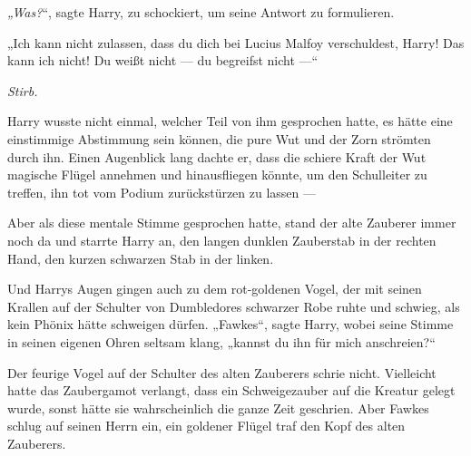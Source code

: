 \emph{„Was?}“, sagte Harry, zu schockiert, um seine Antwort zu formulieren.

„Ich kann nicht zulassen, dass du dich bei Lucius Malfoy verschuldest, Harry! Das kann ich nicht! Du weißt nicht — du begreifst nicht —“

\emph{Stirb.}

Harry wusste nicht einmal, welcher Teil von ihm gesprochen hatte, es hätte eine einstimmige Abstimmung sein können, die pure Wut und der Zorn strömten durch ihn. Einen Augenblick lang dachte er, dass die schiere Kraft der Wut magische Flügel annehmen und hinausfliegen könnte, um den Schulleiter zu treffen, ihn tot vom Podium zurückstürzen zu lassen —

Aber als diese mentale Stimme gesprochen hatte, stand der alte Zauberer immer noch da und starrte Harry an, den langen dunklen Zauberstab in der rechten Hand, den kurzen schwarzen Stab in der linken.

Und Harrys Augen gingen auch zu dem rot-goldenen Vogel, der mit seinen Krallen auf der Schulter von Dumbledores schwarzer Robe ruhte und schwieg, als kein Phönix hätte schweigen dürfen.
„Fawkes“, sagte Harry, wobei seine Stimme in seinen eigenen Ohren seltsam klang, „kannst du ihn für mich anschreien?“

Der feurige Vogel auf der Schulter des alten Zauberers schrie nicht. Vielleicht hatte das Zaubergamot verlangt, dass ein Schweigezauber auf die Kreatur gelegt wurde, sonst hätte sie wahrscheinlich die ganze Zeit geschrien. Aber Fawkes schlug auf seinen Herrn ein, ein goldener Flügel traf den Kopf des alten Zauberers.

